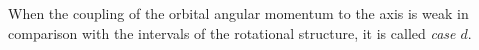 When the coupling of the orbital angular momentum to the axis is weak in comparison with the intervals of the rotational structure, it is called \emph{case $d$}.
